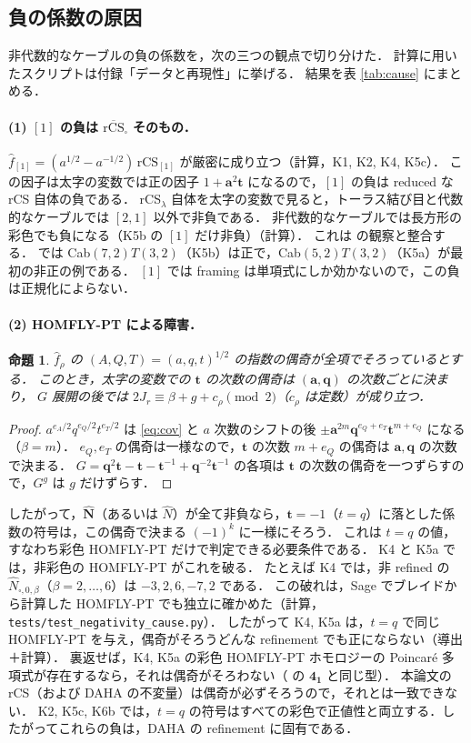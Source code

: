 \documentclass[11pt,a4paper]{ltjsarticle}
\newtheorem{proposition}{命題}[section]
\theoremstyle{definition}
\theoremstyle{remark}
\newcommand{\rCS}{\overline{\mathrm{rCS}}}
\newcommand{\ba}{\mathbf{a}}
\newcommand{\bq}{\mathbf{q}}
\newcommand{\bt}{\mathbf{t}}
\newcommand{\hN}{\widehat{N}}
\newcommand{\hf}{\widehat{f}}
\newcommand{\hbN}{\widehat{\mathbf{N}}}
\begin{document}
\subsection{負の係数の原因}\label{sec:cause}

非代数的なケーブルの負の係数を，次の三つの観点で切り分けた．
計算に用いたスクリプトは付録「データと再現性」に挙げる．
結果を表 \ref{tab:cause} にまとめる．

\paragraph{(1) $[1]$ の負は $\rCS_\square$ そのもの．}
$\hf_{[1]}=(a^{1/2}-a^{-1/2})\,\mathrm{rCS}_{[1]}$ が厳密に成り立つ（計算，K1, K2, K4, K5c）．
この因子は太字の変数では正の因子 $1+\ba^2\bt$ になるので，$[1]$ の負は reduced な rCS 自体の負である．
rCS$_\lambda$ 自体を太字の変数で見ると，トーラス結び目と代数的なケーブルでは $[2,1]$ 以外で非負である．
非代数的なケーブルでは長方形の彩色でも負になる（K5b の $[1]$ だけ非負）（計算）．
これは \cite{CD14} の観察と整合する．\cite{CD14} では Cab$(7,2)T(3,2)$（K5b）は正で，Cab$(5,2)T(3,2)$（K5a）が最初の非正の例である．
$[1]$ では framing は単項式にしか効かないので，この負は正規化によらない．

\paragraph{(2) HOMFLY-PT による障害．}
\begin{proposition}\label{prop:parity}
$\hf_\rho$ の $(A,Q,T)=(a,q,t)^{1/2}$ の指数の偶奇が全項でそろっているとする．
このとき，太字の変数での $\bt$ の次数の偶奇は $(\ba,\bq)$ の次数ごとに決まり，
$G$ 展開の後では $2J_r\equiv\beta+g+c_\rho \pmod 2$（$c_\rho$ は定数）が成り立つ．
\end{proposition}
\begin{proof}
$a^{e_A/2}q^{e_Q/2}t^{e_T/2}$ は \eqref{eq:cov} と $a$ 次数のシフトの後 $\pm\ba^{2m}\bq^{e_Q+e_T}\bt^{m+e_Q}$ になる（$\beta=m$）．
$e_Q,e_T$ の偶奇は一様なので，$\bt$ の次数 $m+e_Q$ の偶奇は $\ba,\bq$ の次数で決まる．
$G=\bq^2\bt-\bt-\bt^{-1}+\bq^{-2}\bt^{-1}$ の各項は $\bt$ の次数の偶奇を一つずらすので，$G^g$ は $g$ だけずらす．
\end{proof}
したがって，$\hbN$（あるいは $\hN$）が全て非負なら，$\bt=-1$（$t=q$）に落とした係数の符号は，この偶奇で決まる $(-1)^k$ に一様にそろう．
これは $t=q$ の値，すなわち彩色 HOMFLY-PT だけで判定できる必要条件である．
K4 と K5a では，非彩色の HOMFLY-PT がこれを破る．
たとえば K4 では，非 refined の $\hN_{\square,0,\beta}$（$\beta=2,\dots,6$）は $-3,2,6,-7,2$ である．
この破れは，Sage でブレイドから計算した HOMFLY-PT でも独立に確かめた（計算，\texttt{tests/test\_negativity\_cause.py}）．
したがって K4, K5a は，$t=q$ で同じ HOMFLY-PT を与え，偶奇がそろうどんな refinement でも正にならない（導出＋計算）．
裏返せば，K4, K5a の彩色 HOMFLY-PT ホモロジーの Poincaré 多項式が存在するなら，それは偶奇がそろわない（\cite{KN} の $\mathbf{4_1}$ と同じ型）．
本論文の rCS（および DAHA の不変量）は偶奇が必ずそろうので，それとは一致できない．
K2, K5c, K6b では，$t=q$ の符号はすべての彩色で正値性と両立する．したがってこれらの負は，DAHA の refinement に固有である．
\end{document}
